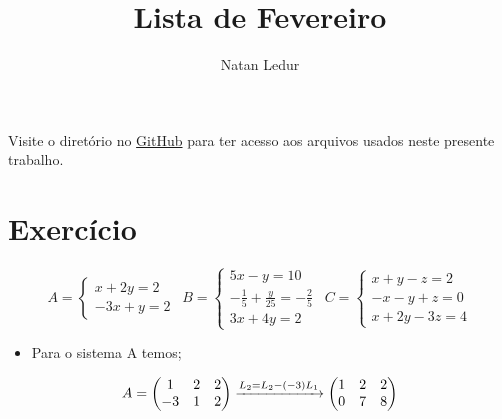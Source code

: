 \documentclass{article}
\title{Lista de Fevereiro}
\author{Natan Ledur}
\begin{document}
\maketitle
Visite o diretório no \href{https://github.com/AnubisNL/numerico/tree/main/Lista%20Mar%C3%A7o}{GitHub} para ter acesso aos arquivos usados neste presente trabalho.

\section{Exercício}
\begin{equation*}
      A= \left\{\begin{matrix} x + 2y = 2 \\  -3x + y=2 \end{matrix}\right. 
       \ \
      B = \left\{\begin{matrix} 5x - y = 10 \\ -\frac{1}{5} + \frac{y}{25} = -\frac{2}{5} \\ 3x+4y=2 \end{matrix}\right.
      \ \
      C = \left\{\begin{matrix}  x + y - z = 2 \\ -x -y +z = 0 \\ x+2y-3z=4 \end{matrix}\right.
      \end{equation*}
      \begin{itemize}
          \item Para o sistema A temos;
      \end{itemize}
      \begin{equation*}
      A=\begin{pmatrix}  1&2  &2 \\   -3&  1& 2\end{pmatrix}
      \xrightarrow[]{L_2=L_2 - (-3)L_1}
      \begin{pmatrix} 1 &2  &2 \\  0& 7 & 8 \end{pmatrix}\displaystyle \displaystyle 
      \end{equation*}
       
\end{document}
